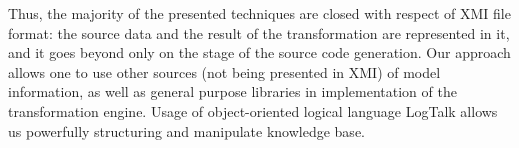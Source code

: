 \documentclass[conference]{IEEEtran}
\begin{document}


Thus, the majority of the presented techniques are closed with respect of XMI file format: the source data and the result of the transformation are represented in it, and it goes beyond only on the stage of the source code generation.  Our approach allows one to use other sources (not being presented in XMI) of model information, as well as general purpose libraries in implementation of the transformation engine.  Usage of object-oriented logical language LogTalk allows us powerfully structuring and manipulate knowledge base. %


\end{document}

